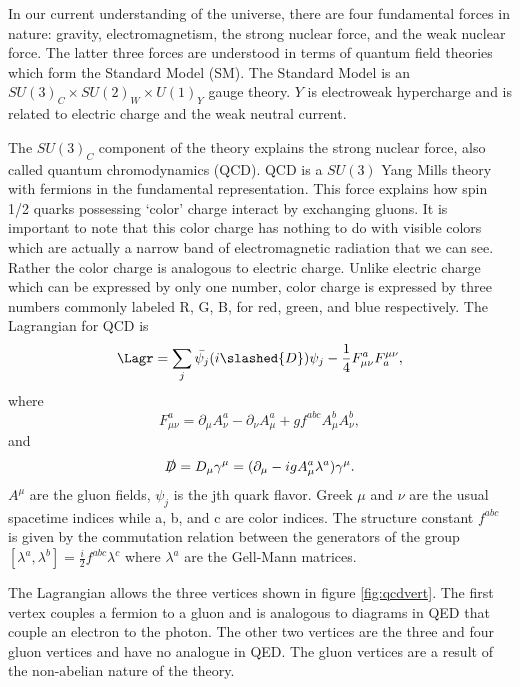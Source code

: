 
In our current understanding of the universe, there are four fundamental forces in nature: gravity, electromagnetism, the strong nuclear force, and the weak nuclear force.
The latter three forces are understood in terms of quantum field theories which form the Standard Model (SM).
The Standard Model is an $SU(3)_C\times SU(2)_W\times U(1)_Y$ gauge theory.
$Y$ is electroweak hypercharge and is related to electric charge and the weak neutral current.

The $SU(3)_C$ component of the theory explains the strong nuclear force, also called quantum chromodynamics (QCD).
QCD is a $SU(3)$ Yang Mills theory with fermions in the fundamental representation.
This force explains how spin 1/2 quarks possessing `color' charge interact by exchanging gluons.
It is important to note that this color charge has nothing to do with visible colors which are actually a narrow band of electromagnetic radiation that we can see.
Rather the color charge is analogous to electric charge.
Unlike electric charge which can be expressed by only one number, color charge is expressed by three numbers commonly labeled R, G, B, for red, green, and blue respectively.
The Lagrangian for QCD is
\begin{equation}
  \label{eq:qcd}
  \Lagr = \sum_j\bar{\psi_j}(i\slashed{D})\psi_j-\frac{1}{4}F^a_{\mu\nu}F^{\mu\nu}_a,
\end{equation}
where
\begin{equation}
  F^a_{\mu\nu}=\partial_\mu A^a_\nu-\partial_\nu A^a_\mu+gf^{abc}A^b_\mu A^b_\nu,
\end{equation}
and
\begin{equation}
  \slashed{D}=D_\mu\gamma^\mu=(\partial_\mu-igA^a_\mu\lambda^a)\gamma^\mu.
\end{equation}
$A^\mu$ are the gluon fields, $\psi_j$ is the jth quark flavor.
Greek $\mu$ and $\nu$ are the usual spacetime indices while a, b, and c are color indices.
The structure constant $f^{abc}$ is given by the commutation relation between the generators of the group $[\lambda^a,\lambda^b]=\frac{i}{2}f^{abc}\lambda^c$ where $\lambda^a$ are the Gell-Mann matrices.

The Lagrangian allows the three vertices shown in figure \ref{fig:qcdvert}.
The first vertex couples a fermion to a gluon and is analogous to diagrams in QED that couple an electron to the photon.
The other two vertices are the three and four gluon vertices and have no analogue in QED.
The gluon vertices are a result of the non-abelian nature of the theory.

